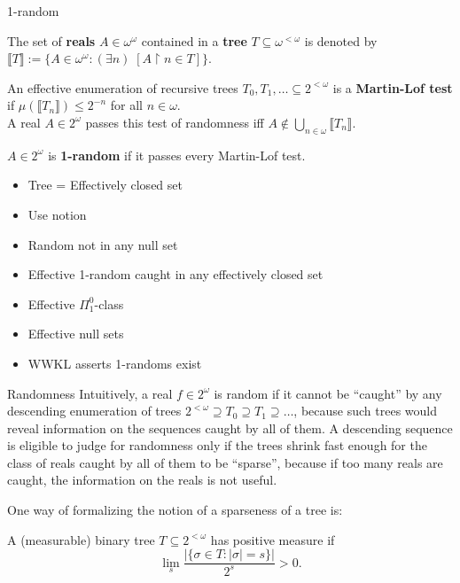 \begin{frame}{1-random}
  \begin{notation*}
    The set of \textbf{reals} $A\in\omega^\omega$ contained in a
    \textbf{tree} $T\subseteq\omega^{<\omega}$ is denoted by $\llbracket
    T\rrbracket:= \{A\in\omega^\omega: (\exists n)\; [A\restriction n \in
    T]\}$.
  \end{notation*}

  \begin{define*}
    An effective enumeration of recursive trees $T_0,T_1,\ldots \subseteq
    2^{<\omega}$ is a \textbf{Martin-Lof test} if
    $\mu(\llbracket T_n\rrbracket) \leq 2^{-n}$ for all $n\in\omega$.\\
    \vspace{0.5em}
    A real $A\in2^\omega$ passes this test of randomness iff $A\not\in
    \bigcup_{n\in\omega} \llbracket T_n\rrbracket$.
  \end{define*}

  \begin{define*}[1-random]
    $A\in2^\omega$ is \textbf{1-random} if it passes every Martin-Lof test.
  \end{define*}
\end{frame}

\begin{frame}
  \begin{itemize}
    \item Tree = Effectively closed set
    \item Use notion
    \item Random not in any null set
    \item Effective 1-random caught in any effectively closed set
    \item Effective $\Pi_1^0$-class
    \item Effective null sets
    \item WWKL asserts 1-randoms exist
  \end{itemize}
\end{frame}

\begin{frame}{Randomness}
  Intuitively, a real $f\in2^\omega$ is random if it cannot be ``caught''
  by any descending enumeration of trees $2^{<\omega}\supseteq T_0\supseteq
  T_1\supseteq \ldots$, because such trees would reveal information on the
  sequences caught by all of them. A descending sequence is eligible to judge
  for randomness only if the trees shrink fast enough for the class of reals
  caught by all of them to be ``sparse'', because if too many reals are
  caught, the information on the reals is not useful.

  \vspace{1em}
  One way of formalizing the notion of a sparseness of a tree is:
  \begin{define*}
    A (measurable) binary tree $T\subseteq2^{<\omega}$ has positive measure
    if
    \[\lim_s \frac{|\{\sigma\in T: |\sigma|=s\}|}{2^s} >0.\]
  \end{define*}
\end{frame}

